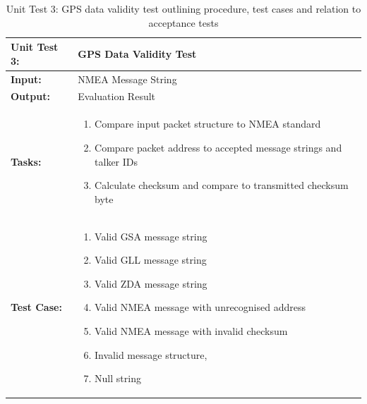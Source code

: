 \begin{table}[H]
    \centering
    \caption{Unit Test 3: GPS data validity test outlining procedure, test cases and relation to acceptance tests}
    \begin{tabular}{|m{}|m{}|}
    \hline
       \textbf{Unit Test 3: }  &  GPS Data Validity Test\\
       \hline
        \textbf{Input: } &  NMEA Message String\\
        \hline
        \textbf{Output: } & Evaluation Result\\
        \hline
        \textbf{Tasks: } & \begin{enumerate}
        \vspace{1mm}
            \item Compare input packet structure to NMEA standard
            \item Compare packet address to accepted message strings and talker IDs
            \item Calculate checksum and compare to transmitted checksum byte
        \end{enumerate}\\
        \hline
        \textbf{Test Case: } & \begin{enumerate}
            \vspace{1mm}
            \item Valid GSA message string
            \item Valid GLL message string
            \item Valid ZDA message string
            \item Valid NMEA message with unrecognised address
            \item Valid NMEA message with invalid checksum
            \item Invalid message structure,
            \item Null string
        \end{enumerate}\\
        \hline
    \end{tabular}

    \label{tab:SUBSYS}
\end{table}

